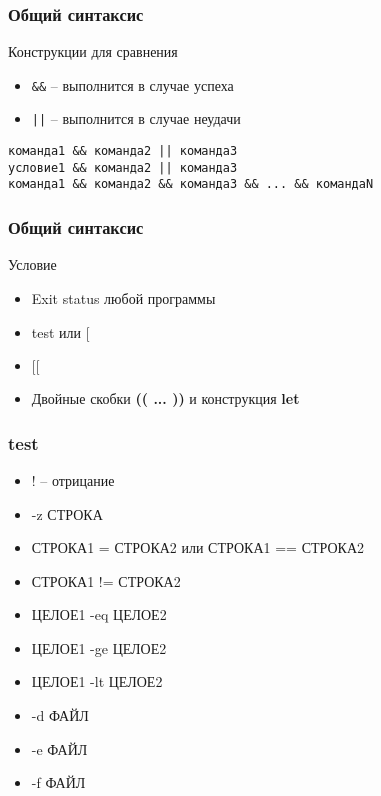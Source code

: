 \begin{frame}[fragile]
    \frametitle{Общий синтаксис}


	\begin{block}{Конструкции для сравнения}
		\begin{itemize}
			\item {\tt \&\&} -- выполнится в случае успеха
			\item {\tt ||} -- выполнится в случае неудачи
		\end{itemize}
	\end{block}

	\begin{verbatim}
команда1 && команда2 || команда3
условие1 && команда2 || команда3
команда1 && команда2 && команда3 && ... && командаN
	\end{verbatim}

\end{frame}

\begin{frame}
    \frametitle{Общий синтаксис}

	\begin{block}{Условие}
		\begin{itemize}
			\item Exit status любой программы
			\item test или $[$ 
			\item $[[$
			\item Двойные скобки {\bf (( ... ))} и конструкция {\bf let}
		\end{itemize}
	\end{block}

\end{frame}


\begin{frame}[fragile]
\frametitle{test}

	\begin{itemize}
	    \item ! -- отрицание
	    \item -z СТРОКА
	    \item СТРОКА1 = СТРОКА2 или  СТРОКА1 == СТРОКА2 
	    \item СТРОКА1 != СТРОКА2
	    \item ЦЕЛОЕ1 -eq ЦЕЛОЕ2
	    \item ЦЕЛОЕ1 -ge ЦЕЛОЕ2
	    \item ЦЕЛОЕ1 -lt ЦЕЛОЕ2
	    \item -d ФАЙЛ
	    \item -e ФАЙЛ
	    \item -f ФАЙЛ
	\end{itemize}

\end{frame}


